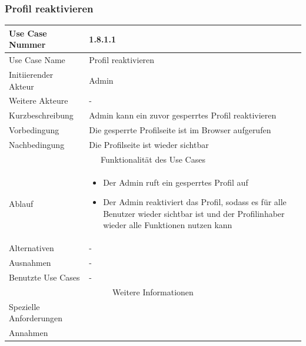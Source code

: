 \documentclass[10pt,a4paper]{article}
\begin{document}
			\subsubsection{Profil reaktivieren}
		\begin{tabular}{|l|p{.5\linewidth}|}
		\hline Use Case Nummer & 1.8.1.1 \\ 
		\hline Use Case Name & Profil reaktivieren \\ 
		\hline Initiierender Akteur & Admin \\
		\hline Weitere Akteure & - \\
		\hline Kurzbeschreibung & Admin kann ein zuvor gesperrtes Profil reaktivieren \\
		\hline Vorbedingung & Die gesperrte Profilseite ist im Browser aufgerufen \\
		\hline Nachbedingung & Die Profilseite ist wieder sichtbar \\
		\hline \multicolumn{2}{|c|}{Funktionalität des Use Cases}\\
		\hline Ablauf & \begin{itemize}
					\item Der Admin ruft ein gesperrtes Profil auf
					\item Der Admin reaktiviert das Profil, sodass es f\"ur alle Benutzer wieder sichtbar ist und der Profilinhaber wieder alle Funktionen nutzen kann
				\end{itemize}\\
		\hline Alternativen & - \\
		\hline Ausnahmen & - \\
		\hline Benutzte Use Cases & - \\
		\hline \multicolumn{2}{|c|}{Weitere Informationen} \\
		\hline Spezielle Anforderungen &  \\
		\hline Annahmen &  \\
		\hline
		\end{tabular}
		
\end{document}
